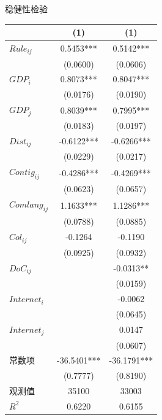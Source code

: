 \documentclass{beamer}
\begin{document}
\begin{frame}{稳健性检验}
    \vspace{-0.5cm}
    \tiny
    \setlength{\tabcolsep}{3pt}
    \centering
    \begin{threeparttable}
    \captionsetup{font=tiny}
    \caption{稳健性检验-重新度量数字贸易指标}
    \renewcommand{\arraystretch}{0.8} %
    \begin{tabular}{lcc}
    \toprule
    & \multicolumn{1}{c}{(1)} & \multicolumn{1}{c}{(1)} \\
    \midrule
    $Rule_{ij}$ & 0.5453*** & 0.5142*** \\
    & (0.0600) & (0.0606) \\
    $GDP_i$ & 0.8073*** & 0.8047*** \\
    & (0.0176) & (0.0190) \\
    $GDP_j$ & 0.8039*** & 0.7995*** \\
    & (0.0183) & (0.0197) \\
    $Dist_{ij}$ & -0.6122*** & -0.6266*** \\
    & (0.0229) & (0.0217) \\
    $Contig_{ij}$ & -0.4286*** & -0.4269*** \\
    & (0.0623) & (0.0657) \\
    $Comlang_{ij}$ & 1.1633*** & 1.1286*** \\
    & (0.0788) & (0.0885) \\
    $Col_{ij}$ & -0.1264 & -0.1190 \\
    & (0.0925) & (0.0932) \\
    $DoC_{ij}$ & & -0.0313** \\
    & & (0.0159) \\
    $Internet_i$ & & -0.0062 \\
    & & (0.0645) \\
    $Internet_j$ & & 0.0147 \\
    & & (0.0607) \\
    常数项 & -36.5401*** & -36.1791*** \\
    & (0.7777) & (0.8190) \\
    观测值 & 35100 & 33003 \\
    $R^2$ & 0.6220 & 0.6155 \\
    \bottomrule
    \end{tabular}
    \end{threeparttable}
\end{frame}
\end{document}
